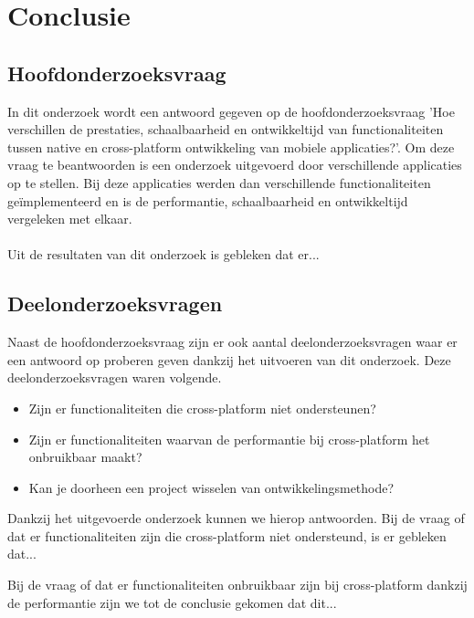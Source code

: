 
\chapter{Conclusie}%
\label{ch:conclusie}


\section{Hoofdonderzoeksvraag}
In dit onderzoek wordt een antwoord gegeven op de hoofdonderzoeksvraag 'Hoe verschillen de prestaties, 
schaalbaarheid en ontwikkeltijd van functionaliteiten tussen native en cross-platform ontwikkeling van mobiele applicaties?'. 
Om deze vraag te beantwoorden is een onderzoek uitgevoerd door verschillende applicaties op te stellen. 
Bij deze applicaties werden dan verschillende functionaliteiten geïmplementeerd en is de performantie, schaalbaarheid en ontwikkeltijd vergeleken met elkaar. 
\\\\
Uit de resultaten van dit onderzoek is gebleken dat er...


\section{Deelonderzoeksvragen}
Naast de hoofdonderzoeksvraag zijn er ook aantal deelonderzoeksvragen waar er een antwoord op proberen geven dankzij het uitvoeren van dit onderzoek. 
Deze deelonderzoeksvragen waren volgende.
\begin{itemize}
    \item Zijn er functionaliteiten die cross-platform niet ondersteunen?
    \item Zijn er functionaliteiten waarvan de performantie bij cross-platform het onbruikbaar maakt?
    \item Kan je doorheen een project wisselen van ontwikkelingsmethode?
\end{itemize}
Dankzij het uitgevoerde onderzoek kunnen we hierop antwoorden. Bij de vraag of dat er functionaliteiten zijn die cross-platform niet ondersteund, 
is er gebleken dat...

Bij de vraag of dat er functionaliteiten onbruikbaar zijn bij cross-platform dankzij de performantie zijn we tot de conclusie gekomen dat dit...
